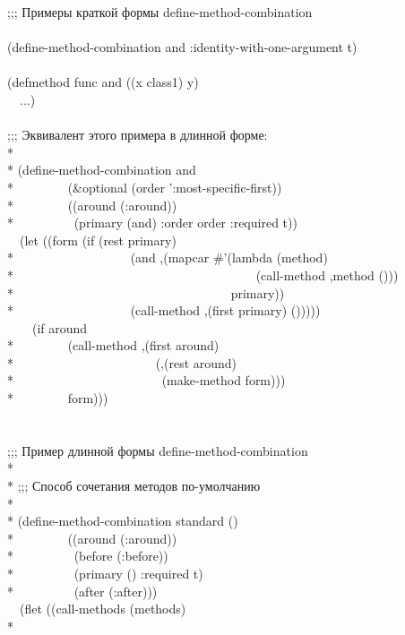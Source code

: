 \begin{defmac}
\begin{lisp}
;;; Примеры краткой формы define-method-combination \\
\\
(define-method-combination and :identity-with-one-argument t) \\
\\
(defmethod func and ((x class1) y) \\
~~...) \\
\\
;;; Эквивалент этого примера в длинной форме: \\*
\\*
(define-method-combination and \\*
~~~~~~~~(\&optional (order ':most-specific-first)) \\*
~~~~~~~~((around (:around)) \\*
~~~~~~~~~(primary (and) :order order :required t)) \\
~~(let ((form (if (rest primary) \\*
~~~~~~~~~~~~~~~~~~{\Xbq}(and ,{\Xatsign}(mapcar \#'(lambda (method) \\*
~~~~~~~~~~~~~~~~~~~~~~~~~~~~~~~~~~~~~~{\Xbq}(call-method ,method ())) \\*
~~~~~~~~~~~~~~~~~~~~~~~~~~~~~~~~~~primary)) \\*
~~~~~~~~~~~~~~~~~~{\Xbq}(call-method ,(first primary) ())))) \\
~~~~(if around \\*
~~~~~~~~{\Xbq}(call-method ,(first around) \\*
~~~~~~~~~~~~~~~~~~~~~~(,{\Xatsign}(rest around) \\*
~~~~~~~~~~~~~~~~~~~~~~~(make-method form))) \\*
~~~~~~~~form))) \\
\\
\\
;;; Пример длинной формы define-method-combination \\*
\\*
;;; Способ сочетания методов по-умолчанию \\*
\\*
(define-method-combination standard () \\*
~~~~~~~~((around (:around)) \\*
~~~~~~~~~(before (:before)) \\*
~~~~~~~~~(primary () :required t) \\*
~~~~~~~~~(after (:after))) \\
~~(flet ((call-methods (methods) \\*

\end{lisp}
\end{defmac}
